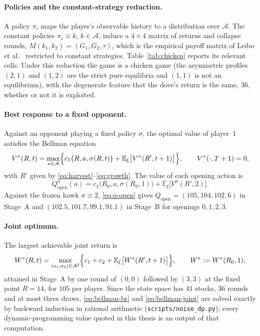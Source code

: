 \paragraph{Policies and the constant-strategy reduction.}
A policy \(\pi_i\) maps the player's observable history to a distribution
over \(\mathcal{A}\).
The constant policies \(\pi_i \equiv k\), \(k \in \mathcal{A}\), induce a
\(4 \times 4\) matrix of returns and collapse rounds,
\(M(k_1, k_2) = (G_1, G_2, \tau)\), which is the empirical payoff matrix of
Leibo et al.\ \cite{leibo2017} restricted to constant strategies.
Table~\ref{tab:chicken} reports its relevant cells.
Under this reduction the game is a chicken game (the asymmetric profiles
\((2,1)\) and \((1,2)\) are the strict pure equilibria and \((1,1)\) is not
an equilibrium), with the degenerate feature that the dove's return is the
same, \(36\), whether or not it is exploited.

\paragraph{Best response to a fixed opponent.}
Against an opponent playing a fixed policy \(\sigma\), the optimal value of
player~1 satisfies the Bellman equation
\begin{equation}
  V^{\sigma}(R, t) = \max_{a \in \mathcal{A}}
  \Bigl\{ c_1\bigl(R, a, \sigma(R, t)\bigr)
  + \mathbb{E}_{\xi}\bigl[ V^{\sigma}(R', t+1) \bigr] \Bigr\},
  \qquad V^{\sigma}(\cdot, T+1) = 0,
  \label{eq:bellman-br}
\end{equation}
with \(R'\) given by \eqref{eq:harvest}--\eqref{eq:growth}.
The value of each opening action is
\begin{equation}
  Q^{\sigma}_{\mathrm{open}}(a) = c_1\bigl(R_0, a, \sigma(R_0, 1)\bigr)
  + \mathbb{E}_{\xi}\bigl[ V^{\sigma}(R', 2) \bigr] .
  \label{eq:q-open}
\end{equation}
Against the frozen hawk \(\sigma \equiv 2\), \eqref{eq:q-open} gives
\(Q_{\mathrm{open}} = (105, 104, 102, 6)\) in Stage~A and
\((102.5, 101.7, 99.1, 91.1)\) in Stage~B for openings \(0, 1, 2, 3\).

\paragraph{Joint optimum.}
The largest achievable joint return is
\begin{equation}
  W^{*}(R, t) = \max_{(a_1, a_2) \in \mathcal{A}^2}
  \Bigl\{ c_1 + c_2 + \mathbb{E}_{\xi}\bigl[ W^{*}(R', t+1) \bigr] \Bigr\},
  \qquad W^{*} := W^{*}(R_0, 1),
  \label{eq:bellman-joint}
\end{equation}
attained in Stage~A by one round of \((0,0)\) followed by \((3,3)\) at the
fixed point \(R = 14\), for \(105\) per player.
Since the state space has \(41\) stocks, \(36\) rounds and at most three
draws, \eqref{eq:bellman-br} and \eqref{eq:bellman-joint} are solved
exactly by backward induction in rational arithmetic
(\texttt{scripts/noise\_dp.py}); every dynamic-programming value quoted
in this thesis is an output of that computation.

